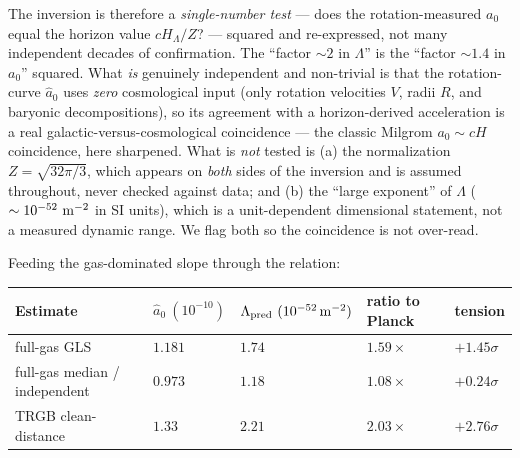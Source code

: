 \documentclass[
]{article}
\newcounter{none} %
\begin{document}
The inversion is therefore a \emph{single-number test} --- does the
rotation-measured \(a_0\) equal the horizon value \(cH_\Lambda/Z\)? ---
squared and re-expressed, not many independent decades of confirmation.
The ``factor \(\sim2\) in \(\Lambda\)'' is the ``factor \(\sim1.4\) in
\(a_0\)'' squared. What \emph{is} genuinely independent and non-trivial
is that the rotation-curve \(\hat a_0\) uses \emph{zero} cosmological
input (only rotation velocities \(V\), radii \(R\), and baryonic
decompositions), so its agreement with a horizon-derived acceleration is
a real galactic-versus-cosmological coincidence --- the classic Milgrom
\(a_0\sim cH\) coincidence, here sharpened. What is \emph{not} tested is
(a) the normalization \(Z=\sqrt{32\pi/3}\), which appears on \emph{both}
sides of the inversion and is assumed throughout, never checked against
data; and (b) the ``large exponent'' of \(\Lambda\)
(\(\sim10^{-52}\ {\rm m^{-2}}\) in SI units), which is a unit-dependent
dimensional statement, not a measured dynamic range. We flag both so the
coincidence is not over-read.

Feeding the gas-dominated slope through the relation:

{\def\LTcaptype{none} %
\begin{longtable}[]{@{}
  >{\raggedright\arraybackslash}p{}
  >{\raggedright\arraybackslash}p{}
  >{\raggedright\arraybackslash}p{}
  >{\raggedright\arraybackslash}p{}
  >{\raggedright\arraybackslash}p{}@{}}
\toprule\noalign{}
\begin{minipage}[b]{\linewidth}\raggedright
Estimate
\end{minipage} & \begin{minipage}[b]{\linewidth}\raggedright
\(\hat a_0\ (10^{-10})\)
\end{minipage} & \begin{minipage}[b]{\linewidth}\raggedright
\(\Lambda_\mathrm{pred}\ (10^{-52}\,{\rm m^{-2}})\)
\end{minipage} & \begin{minipage}[b]{\linewidth}\raggedright
ratio to Planck
\end{minipage} & \begin{minipage}[b]{\linewidth}\raggedright
tension
\end{minipage} \\
\midrule\noalign{}
\endhead
\bottomrule\noalign{}
\endlastfoot
full-gas GLS & \(1.181\) & \(1.74\) & \(1.59\times\) &
\(+1.45\sigma\) \\
full-gas median / independent & \(0.973\) & \(1.18\) & \(1.08\times\) &
\(+0.24\sigma\) \\
TRGB clean-distance & \(1.33\) & \(2.21\) & \(2.03\times\) &
\(+2.76\sigma\) \\
\end{longtable}
}
\end{document}
